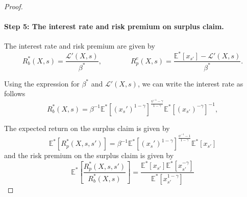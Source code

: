 \begin{proof}
\paragraph{Step 5: The interest rate and risk premium on surplus claim.} The interest rate and risk premium are given by
\begin{equation}
    R_b^*(X,s) = \frac{\mathcal{L}'(X,s)}{\beta^*}, \qquad \qquad R_p^e(X,s) = \frac{\mathbb{E}^*[x_{s'}]- \mathcal{L}'(X,s)}{\beta^*}.
\end{equation}

Using the expression for $\beta^*$ and $\mathcal{L}'(X,s)$, we can write the interest rate as follows
\begin{equation}
    R^*_b(X,s) = \beta^{-1} \mathbb{E}^*[ (x_s')^{1-\gamma} ]^{\frac{\psi^{-1}-\gamma}{1-\gamma}} \mathbb{E}^*[(x_{s'})^{-\gamma}]^{-1},
\end{equation}

The expected return on the surplus claim is given by
\begin{equation}
    \mathbb{E}^*\left[R^*_p(X,s,s') \right]= \beta^{-1} \mathbb{E}^*[(x_s')^{1-\gamma}]^{\frac{\psi^{-1}-1}{1-\gamma}} \mathbb{E}^*[x_{s'}]
\end{equation}
and the risk premium on the surplus claim is given by
\begin{equation}
    \mathbb{E}^*\left[\frac{R^*_p(X,s,s')}{R_b^*(X,s)} \right] = \frac{\mathbb{E}^*[x_{s'}] \mathbb{E}^*[x_{s'}^{-\gamma}]}{\mathbb{E}^*[x_{s'}^{1-\gamma}] }
\end{equation}
\end{proof}

